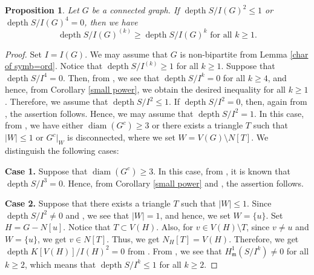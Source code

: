 \documentclass[12pt]{amsart}
\newtheorem{prop}[thm]{Proposition}
\theoremstyle{definition}
\theoremstyle{remark}
\DeclareMathOperator{\diam}{diam}
\DeclareMathOperator{\depth}{depth}
\begin{document}
\begin{prop}\label{sufficient}
Let $G$ be a connected graph. If $\depth S/I(G)^{2}\leq1$ or $\depth S/I(G)^{4}=0$, then we have  
$$\depth S/I(G)^{(k)}\geq\depth S/I(G)^{k}\mbox{ for all }k\geq1.$$
\end{prop}
\begin{proof}
Set $I=I(G)$. We may assume that $G$ is non-bipartite from Lemma \ref{char of symb=ord}. Notice that $\depth S/I^{(k)}\geq1$ for all $k\geq1$. Suppose that $\depth S/I^{4}=0$. Then, from \cite[Theorem 2.15]{mmv2012}, we see that $\depth S/I^{k}=0$ for all $k\geq4$, and hence, from Corollary \ref{small power}, we obtain the desired inequality for all $k\geq1$. Therefore, we assume that $\depth S/I^{2}\leq1$. If $\depth S/I^{2}=0$, then, again from \cite[Theorem 2.15]{mmv2012}, the assertion follows. Hence, we may assume that $\depth S/I^{2}=1$. In this case, from \cite[Theorem 4.8]{tt2014}, we have either $\diam(G^{c})\geq3$ or there exists a triangle $T$ such that $|W|\leq1$ or $G^{c}|_{W}$ is disconnected, where we set $W=V(G)\setminus N[T]$. 
We distinguish the following cases: 

{\bf Case 1.} Suppose that $\diam(G^{c})\geq3$. In this case, from \cite[Proposition 4.5]{hlt2023}, it is known that $\depth S/I^{3}=0$. Hence, from Corollary \ref{small power} and \cite[Theorem 2.15]{mmv2012}, the assertion follows. 

{\bf Case 2.} Suppose that there exists a triangle $T$ such that $|W|\leq1$. Since $\depth S/I^{2}\neq0$ and \cite[Theorem 2.8]{tt2014}, we see that $|W|=1$, and hence, we set $W=\{u\}$. Set $H=G-N[u]$. Notice that $T\subset V(H)$. Also, for $v\in V(H)\setminus T$, since $v\neq u$ and $W=\{u\}$, we get $v\in N[T]$. Thus, we get $N_{H}[T]=V(H)$. Therefore, we get $\depth K[V(H)]/I(H)^{2}=0$ from \cite[Theorem 2.8]{tt2014}. From \cite[Proposition 1.6, Lemma 1.7, Proposition 3.1]{hlt2023}, we see that $H_{\mathfrak{m}}^{1}(S/I^{k})\neq0$ for all $k\geq2$, which means that $\depth S/I^{k}\leq1$ for all $k\geq2$. 


\end{proof}
\end{document}
